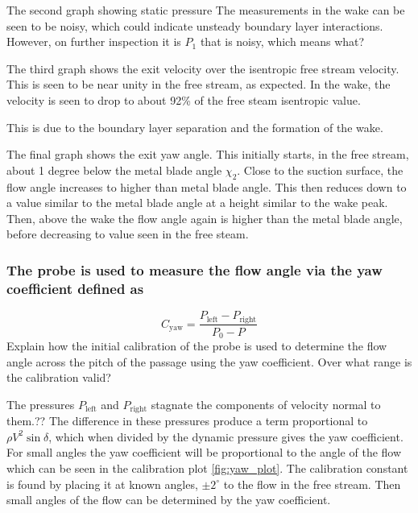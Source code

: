 \documentclass{article}
\begin{document}
The second graph showing static pressure 
The measurements in the wake can be seen to be noisy, which could indicate unsteady boundary layer interactions.
However, on further inspection it is $P_1$ that is noisy, which means what? %

The third graph shows the exit velocity over the isentropic free stream velocity.
This is seen to be near unity in the free stream, as expected.
In the wake, the velocity is seen to drop to about 92\% of the free steam isentropic value.

This is due to the boundary layer separation and the formation of the wake.

The final graph shows the exit yaw angle.
This initially starts, in the free stream, about 1 degree below the metal blade angle $\chi_2$.
Close to the suction surface, the flow angle increases to higher than metal blade angle.
This then reduces down to a value similar to the metal blade angle at a height similar to the wake peak.
Then, above the wake the flow angle again is higher than the metal blade angle, before decreasing to value seen in the free steam.


\subsubsection{The probe is used to measure the flow angle via the yaw coefficient defined as
}

\begin{equation}
    C_\text{yaw} = \frac{P_\text{left} - P_\text{right}}{P_0 - P}
\end{equation}
Explain how the initial calibration of the probe is used to determine the flow angle across the
pitch of the passage using the yaw coefficient. Over what range is the calibration valid?

The pressures $P_\text{left}$ and $P_\text{right}$ stagnate the components of velocity normal to them.?? %
The difference in these pressures  produce a term proportional to $\rho V^2 \sin \delta$, which when divided by the dynamic pressure gives the yaw coefficient.
For small angles the yaw coefficient will be proportional to the angle of the flow which can be seen in the calibration plot \ref{fig:yaw_plot}.
The calibration constant is found by placing it at known angles, $\pm 2^\circ$ to the flow in the free stream.
Then small angles of the flow can be determined by the yaw coefficient.
\end{document}
